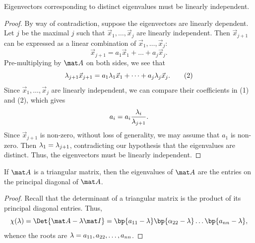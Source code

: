 \begin{proposition}
    Eigenvectors corresponding to distinct eigenvalues must be linearly independent.
\end{proposition}
\begin{proof}
    By way of contradiction, suppose the eigenvectors are linearly dependent. Let $j$ be the maximal $j$ such that $\vec x_1, \dots, \vec x_j$ are linearly independent. Then $\vec x_{j+1}$ can be expressed as a linear combination of $\vec x_1, \dots, \vec x_j$: \[\vec x_{j+1} = a_1 \vec x_1 + \dots + a_j \vec x_j. \tag{1}\] Pre-multiplying by $\mat A$ on both sides, we see that \[\lambda_{j+1} \vec x_{j+1} = a_1 \lambda_1 \vec x_1 + \dots + a_j \lambda_j \vec x_j.\tag{2}\] Since $\vec x_1, \dots, \vec x_j$ are linearly independent, we can compare their coefficients in (1) and (2), which gives \[a_i = a_i \frac{\lambda_i}{\lambda_{j+1}}.\] Since $\vec x_{j+1}$ is non-zero, without loss of generality, we may assume that $a_1$ is non-zero. Then $\lambda_1 = \lambda_{j+1}$, contradicting our hypothesis that the eigenvalues are distinct. Thus, the eigenvectors must be linearly independent.
\end{proof}

\begin{proposition}
    If $\mat A$ is a triangular matrix, then the eigenvalues of $\mat A$ are the entries on the principal diagonal of $\mat A$.
\end{proposition}
\begin{proof}
    Recall that the determinant of a triangular matrix is the product of its principal diagonal entries. Thus, \[\c(\l) = \Det{\mat A - \l \mat I} = \bp{a_{11} - \l}\bp{\a_{22} - \l} \dots \bp{a_{nn} - \l},\] whence the roots are $\lambda = a_{11}, a_{22}, \dots, a_{nn}$.
\end{proof}

